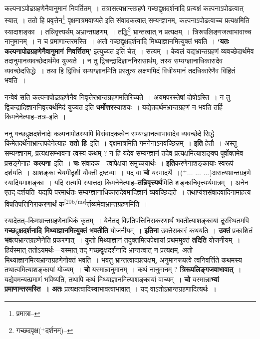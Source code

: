 \documentclass[article,12pt,a4paper]{memoir}
\newcommand{\add}[1]{($^{+}$#1)}
\begin{document}
	कल्पनाऽपोढग्रहणेनैवानुमानं निवर्तितम् । तत्रासत्यभ्रान्तग्रहणे गच्छद्वृक्षदर्शनादि प्रत्यक्षं कल्पनाऽपोढत्वात् स्यात् । ततो हि प्रवृत्तेन\footnote{प्रमात्रा--\cite{dp-msD-n}} वृक्षमात्रमवाप्यते इति संवादकत्वात् सम्यग्ज्ञानम्, कल्पनाऽपोढत्वाच्च प्रत्यक्षमिति स्यादाशङ्का । तन्निवृत्त्यर्थम् अभ्रान्तग्रहणम् । तद्धि\footnote{गच्छदवृक्ष\add{दर्शनम्}--\cite{dp-msD-n}} भ्रान्तत्वात् न प्रत्यक्षम् । त्रिरूपलिङ्गजत्वाभावाच्च नानुमानम् । न च प्रमाणान्तरमस्ति । अतो गच्छद्वृक्षदर्शनादि मिथ्याज्ञानमित्युक्तं भवति । \textbf{‘यतः कल्पनापोढग्रहणेनैवानुमानं निवर्त्तितम्’} इत्युच्यत इति चेत् । सत्यम् । केवलं यद्यभ्रान्तग्रहणं व्यवच्छेदार्थमेव तदानुमानव्यवच्छेदार्थमेव युज्यते । न तु द्विचन्द्रादिज्ञाननिरासार्थम्, तस्य सम्यग्ज्ञानाधिकारादेव व्यवच्छेदसिद्धेः । तथा हि द्विविधं सम्यग्ज्ञानमिति प्रस्तुत्य लक्षणमिदं विधीयमानं तदधिकारेणैव विहितं भवति ।
	\pend
      

	  \pstart नन्वेवं सति कल्पनापोढग्रहणेनैव निवृत्तेरभ्रान्तग्रहणमतिरिच्यते । अयमपरस्तेषां दोषोऽस्ति । न तु द्विचन्द्रादिज्ञाननिवृत्त्यर्थमिदं युज्यत इति \textbf{धर्मोत्तर}स्याशयः । यद्येतदर्थमभ्रान्तग्रहणं न भवति तर्हि किमनेनेत्याह--तत्र--इति ।
	\pend
      

	  \pstart ननु गच्छद्वृक्षदर्शनादेः कल्पनापोढस्यापि विसंवादकत्वेन सम्यग्ज्ञानत्वाभावादेव व्यवच्छेदे सिद्धे किमेतदर्थेनाभ्रान्तपदेनेत्याह--\textbf{ततो हि}--इति । वृक्षमात्रमिति गमनेनाऽनवच्छिन्नम् । \textbf{इति} हेतौ । अस्तु सम्यग्ज्ञानम्, प्रत्यक्षसम्भावना त्वस्य कथम् ? न हि यदेव सम्यग्ज्ञानं तदेव प्रत्यक्षमित्याशङ्क्य पूर्वोक्तमेव प्रसङ्गेनाह--\textbf{कल्पना}--इति । \textbf{चः} संवादक—त्वापेक्षया समुच्चयार्थः । \textbf{इति}करणेनाशङ्कायाः स्वरूपं दर्शयति । आशङ्का चेयमीदृशी यौक्ती द्रष्टव्या । यद् वा \textbf{चो} यस्मादर्थे ।\add{... ... ...}असत्यभ्रान्तग्रहणे स्यादियमाशङ्का । यदि सत्यपि स्यात्तदा किमनेनेत्याह--\textbf{तन्निवृत्त्यर्थ}मिति शङ्कानिवृत्त्यर्थमात्रम् । अनेन एतद् दर्शयति--यद्यपि परमार्थतः सम्यग्ज्ञानाधिकारादेवमादिज्ञानं व्यवच्छिद्यते । तथाप्यंशसंवादवादिनामाहत्य विप्रतिपत्तिनिराकरणार्थं क\leavevmode\textsuperscript{\rmlatinfont\tiny [20b/ms]}र्त्तव्यमेवाभ्रान्तग्रहणमिति ।
	\pend
      

	  \pstart स्यादेतत्--किमभ्रान्तग्रहणेनाधिकं कृतम् । येनैतद् विप्रतिपत्तिनिराकरणार्थं भवतीत्याशङ्कायां दूरस्थितमपि \textbf{गच्छ}द्वृ\textbf{क्षदर्शनादि मिथ्याज्ञानमित्युक्तं भवतीति} योजनीयम् । \textbf{इतिना} उक्तेराकारं कथयति । \textbf{उक्तं} प्रकाशितं \textbf{भव}त्यभ्रान्तग्रहणेनेति प्रकरणात् । कुतो मिथ्याज्ञानं तदुक्तमित्यपेक्षायां प्रथममुक्तं \textbf{तदिति} योजनीयम् । हिर्यस्मात् ततोऽयमर्थः—यस्मात् तद् गच्छद्वृक्षदर्शनादि भ्रान्तत्वात् न प्रत्यक्षम्, अतो मिथ्याज्ञानमित्यभ्रान्तग्रहणेनोक्तं भवति । भवतु भ्रान्तत्वादप्रत्यक्षम्, अनुमानरूपत्वे त्वनिवर्त्तिते कथमस्य तथात्वमित्याशङ्कायां योज्यम् । \textbf{चो} यस्मान्नानुमानम् । कथं नानुमानम् ? \textbf{त्रिरूपलिङ्गजवाभावात्} । यद्येवमन्यत्प्रमाणं भविष्यति, तथापि कथं मिथ्याज्ञानमित्याशङ्कायां वाच्यम् । \textbf{चो} यस्मान्ना\textbf{भ्यां प्रमाणान्तरमस्ति । अतः} प्रत्यक्षत्वादिस्वाभावत्वाभावात् । यद् वाऽतोऽभ्रान्तग्रहणादित्यर्थः ।
	\pend
      
\end{document}
